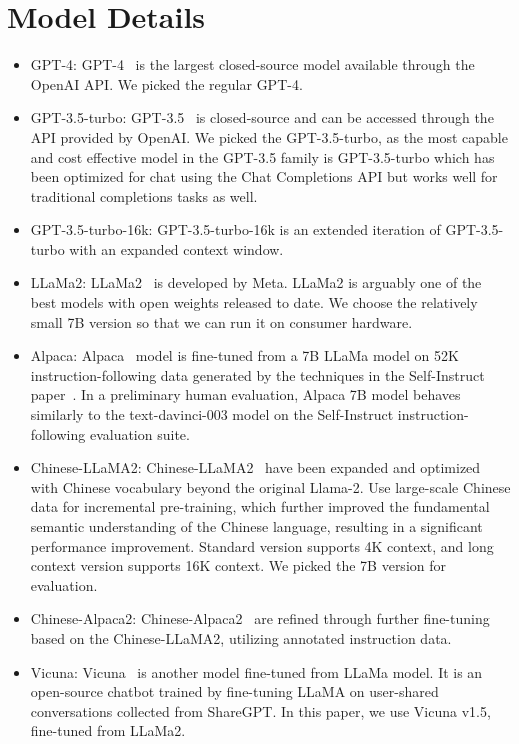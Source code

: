 \section{Model Details}
\label{app: model details}
\begin{itemize}
\item GPT-4: GPT-4~\citep{openai2023gpt4} is the largest closed-source model available through the OpenAI API. We picked the regular GPT-4. 
\item GPT-3.5-turbo: GPT-3.5~\citep{schulman2022chatgpt} is closed-source and can be accessed through the API provided by OpenAI. We picked the GPT-3.5-turbo, as the most capable and cost effective model in the GPT-3.5 family is GPT-3.5-turbo which has been optimized for chat using the Chat Completions API but works well for traditional completions tasks as well.
\item GPT-3.5-turbo-16k: GPT-3.5-turbo-16k is an extended iteration of GPT-3.5-turbo with an expanded context window.
\item LLaMa2: LLaMa2~\citep{touvron2023llama} is developed by Meta. LLaMa2 is arguably one of the best models with open weights released to date. We choose the relatively small 7B version so that we can run it on consumer hardware.
\item Alpaca: Alpaca~\citep{alpaca} model is fine-tuned from a 7B LLaMa model on 52K instruction-following data generated by the techniques in the Self-Instruct paper~\citep{wang2022self}. In a preliminary human evaluation, Alpaca 7B model behaves similarly to the text-davinci-003 model on the Self-Instruct instruction-following evaluation suite.
\item Chinese-LLaMA2: Chinese-LLaMA2~\citep{Chinese-LLaMA-Alpaca} have been expanded and optimized with Chinese vocabulary beyond the original Llama-2. Use large-scale Chinese data for incremental pre-training, which further improved the fundamental semantic understanding of the Chinese language, resulting in a significant performance improvement. Standard version supports 4K context, and long context version supports 16K context. We picked the 7B version for evaluation.
\item Chinese-Alpaca2: Chinese-Alpaca2~\citep{Chinese-LLaMA-Alpaca} are refined through further fine-tuning based on the Chinese-LLaMA2, utilizing annotated instruction data.
\item Vicuna: Vicuna~\citep{chiang2023vicuna} is another model fine-tuned from LLaMa model. It is an open-source chatbot trained by fine-tuning LLaMA on user-shared conversations collected from ShareGPT. In this paper, we use Vicuna v1.5, fine-tuned from LLaMa2.

\end{itemize}
